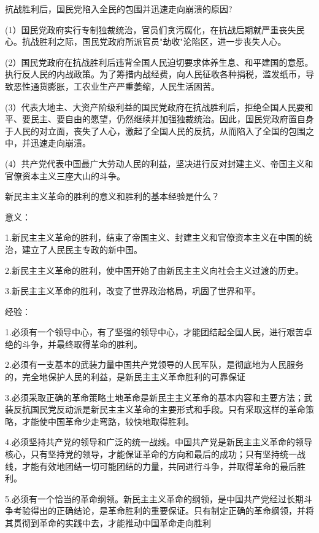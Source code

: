 \documentclass[lang=cn,10pt]{elegantbook}
\begin{document}
	\begin{example}
		抗战胜利后，国民党陷入全民的包围并迅速走向崩溃的原因?
	\end{example}
	\begin{solution}
		
		(1）国民党政府实行专制独裁统治，官员们贪污腐化，在抗战后期就严重丧失民心。抗战胜利之际，国民党政府所派官员"劫收"沦陷区，进一步丧失人心。
		
		(2）国民党政府在抗战胜利后违背全国人民迫切要求体养生息、和平建国的意愿。执行反人民的内战政策。为了筹措内战经费，向人民征收各种捐税，滥发纸币，导致恶性通货膨胀，工农业生产严重萎缩，人民生活困苦。
		
		
		(3）代表大地主、大资产阶级利益的国民党政府在抗战胜利后，拒绝全国人民要和平、要民主、要自由的愿望，仍然继续并加强独裁统治。因此，国民党政府置自身于人民的对立面，丧失了人心，激起了全国人民的反抗，从而陷入了全国的包围之中，并迅速走向崩溃。
		
		(4）共产党代表中国最广大劳动人民的利益，坚决进行反对封建主义、帝国主义和官僚资本主义三座大山的斗争。
	\end{solution}
	\begin{example}
		新民主主义革命的胜利的意义和胜利的基本经验是什么？
	\end{example}
	\begin{solution}
		
		意义：
		
		1.新民主主义革命的胜利，结束了帝国主义、封建主义和官僚资本主义在中国的统治，建立了人民民主专政的新中国。
		
		2.新民主主义革命的胜利，使中国开始了由新民主主义向社会主义过渡的历史。
		
		3.新民主主义革命的胜利，改变了世界政治格局，巩固了世界和平。
		
		经验：
		
		1.必须有一个领导中心，有了坚强的领导中心，才能团结起全国人民，进行艰苦卓绝的斗争，并最终取得革命的胜利。
		
		2.必须有一支基本的武装力量中国共产党领导的人民军队，是彻底地为人民服务的，完全地保护人民的利益，是新民主主义革命胜利的可靠保证
		
		3.必须采取正确的革命策略土地革命是新民主主义革命的基本内容和主要方法；武装反抗国民党反动派是新民主主义革命的主要形式和手段。只有采取这样的革命策略，才能使中国革命少走弯路，较快地取得胜利。
		
		4.必须坚持共产党的领导和广泛的统一战线。中国共产党是新民主主义革命的领导核心，只有坚持党的领导，才能保证革命的方向和最后的成功；只有坚持统一战线，才能有效地团结一切可能团结的力量，共同进行斗争，并取得革命的最后胜利。
		
		5.必须有一个恰当的革命纲领。新民主主义革命的纲领，是中国共产党经过长期斗争考验得出的正确结论，是革命胜利的重要保证。只有制定正确的革命纲领，并将其贯彻到革命的实践中去，才能推动中国革命走向胜利
	\end{solution}
\end{document}
